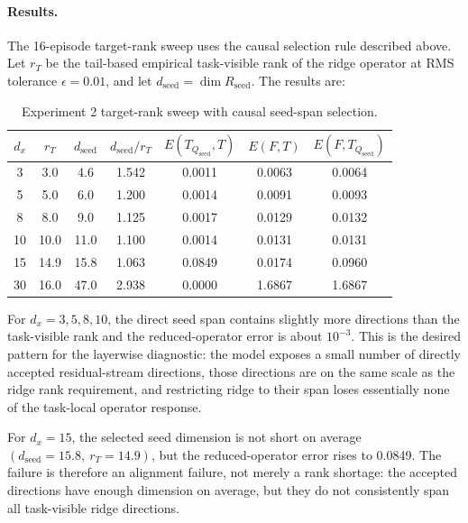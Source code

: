 \documentclass[11pt]{article}
\begin{document}
\paragraph{Results.}
The 16-episode target-rank sweep uses the causal selection rule described above. Let \(r_T\) be the
tail-based empirical task-visible rank of the ridge operator at RMS tolerance \(\epsilon=0.01\), and
let \(d_{\mathrm{seed}}=\dim R_{\mathrm{seed}}\). The results are:

\begin{table}[ht]
\centering
\caption{Experiment 2 target-rank sweep with causal seed-span selection.}
\begin{tabular}{ccccccc}
\toprule
\(d_x\) & \(r_T\) & \(d_{\mathrm{seed}}\) & \(d_{\mathrm{seed}}/r_T\) &
\(E(T_{Q_{\mathrm{seed}}},T)\) & \(E(F,T)\) & \(E(F,T_{Q_{\mathrm{seed}}})\)\\
\midrule
3 & 3.0 & 4.6 & 1.542 & 0.0011 & 0.0063 & 0.0064\\
5 & 5.0 & 6.0 & 1.200 & 0.0014 & 0.0091 & 0.0093\\
8 & 8.0 & 9.0 & 1.125 & 0.0017 & 0.0129 & 0.0132\\
10 & 10.0 & 11.0 & 1.100 & 0.0014 & 0.0131 & 0.0131\\
15 & 14.9 & 15.8 & 1.063 & 0.0849 & 0.0174 & 0.0960\\
30 & 16.0 & 47.0 & 2.938 & 0.0000 & 1.6867 & 1.6867\\
\bottomrule
\end{tabular}
\end{table}

For \(d_x=3,5,8,10\), the direct seed span contains slightly more directions than the task-visible
rank and the reduced-operator error is about \(10^{-3}\). This is the desired pattern for the
layerwise diagnostic: the model exposes a small number of directly accepted residual-stream
directions, those directions are on the same scale as the ridge rank requirement, and restricting
ridge to their span loses essentially none of the task-local operator response.

For \(d_x=15\), the selected seed dimension is not short on average
\((d_{\mathrm{seed}}=15.8,\ r_T=14.9)\), but the reduced-operator error rises to 0.0849. The failure is
therefore an alignment failure, not merely a rank shortage: the accepted directions have enough
dimension on average, but they do not consistently span all task-visible ridge directions.
\end{document}
